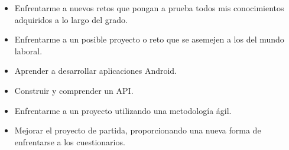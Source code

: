 \begin{itemize}
	
	\item Enfrentarme a nuevos retos que pongan a prueba todos mis conocimientos adquiridos a lo largo del grado.
	
	\item Enfrentarme a un posible proyecto o reto que se asemejen a los del mundo laboral.	
	
	\item Aprender a desarrollar aplicaciones Android.
	
	\item Construir y comprender un API.
	
	\item Enfrentarme a un proyecto utilizando una metodología ágil.
	\item Mejorar el proyecto de partida, proporcionando una nueva forma de enfrentarse a los cuestionarios.

\end{itemize}




















